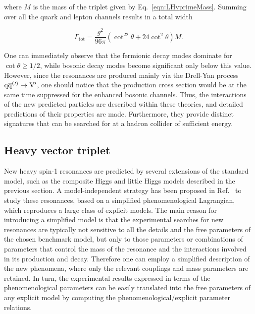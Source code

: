 \noindent where $M$ is the mass of the \PVpr triplet given by Eq.~\ref{eqn:LHvprimeMass}.
Summing over all the quark and lepton channels results in a total width

\begin{equation}\label{eqn:LHvprimeWidth}
\Gamma_\mathrm{tot} = \frac{g^2}{96\pi}(\cot^22\theta + 24\cot^2\theta)M.
\end{equation}

One can immediately observe that the fermionic decay modes dominate for $\cot\theta \geq 1/2$, while bosonic decay modes become significant only below this value.
However, since the \PVpr resonances are produced mainly via the Drell-Yan process $\mathrm{q}\overline{\mathrm{q}}^({}'^){} \to \mathrm{V}^\prime$, one should notice that the production cross section would be at the same time suppressed for the enhanced bosonic channels.
Thus, the interactions of the new predicted particles are described within these theories, and detailed predictions of their properties are made.
Furthermore, they provide distinct signatures that can be searched for at a hadron collider of sufficient energy.

\subsection{Heavy vector triplet}\label{subsec:hvt}

New heavy spin-1 resonances are predicted by several extensions of the standard model, such as the composite Higgs and little Higgs models described in the previous section.
A model-independent strategy has been proposed in Ref.~\cite{Pappadopulo:2014qza} to study these resonances, based on a simplified phenomenological Lagrangian, which reproduces a large class of explicit models.
The main reason for introducing a simplified model is that the experimental searches for new resonances are typically not sensitive to all the details and the free parameters of the chosen benchmark model, but only to those parameters or combinations of parameters that control the mass of the resonance and the interactions involved in its production and decay. Therefore one can employ a simplified description of the new phenomena, where only the relevant couplings and mass parameters are retained. In turn, the experimental results expressed in terms of the phenomenological parameters can be easily translated into the free parameters of any explicit model by computing the phenomenological/explicit parameter relations.\\

